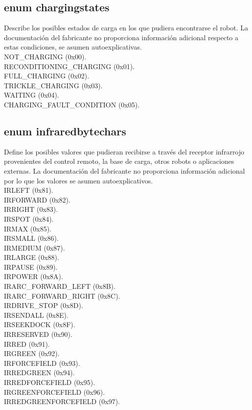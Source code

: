 \documentclass[letterpaper]{book}
\begin{document}
\subsection{enum  chargingstates}
Describe los posibles estados de carga en los que pudiera encontrarse el robot. La documentación del fabricante no proporciona información adicional respecto a estas condiciones, se asumen autoexplicativas.\\
NOT\_CHARGING (0x00).\\
RECONDITIONING\_CHARGING (0x01).\\
FULL\_CHARGING (0x02).\\
TRICKLE\_CHARGING (0x03).\\
WAITING (0x04).\\
CHARGING\_FAULT\_CONDITION (0x05).\\

\subsection{enum infraredbytechars}
Define los posibles valores que pudieran recibirse a través del receptor infrarrojo provenientes del control remoto, la base de carga, otros robots o aplicaciones externas. La documentación del fabricante no proporciona información adicional por lo que los valores se asumen autoexplicativos.\\
IRLEFT (0x81).\\
IRFORWARD (0x82).\\
IRRIGHT (0x83).\\
IRSPOT (0x84).\\
IRMAX (0x85).\\
IRSMALL (0x86).\\
IRMEDIUM (0x87).\\
IRLARGE (0x88).\\
IRPAUSE (0x89).\\
IRPOWER (0x8A).\\
IRARC\_FORWARD\_LEFT (0x8B).\\
IRARC\_FORWARD\_RIGHT (0x8C).\\
IRDRIVE\_STOP (0x8D).\\
IRSENDALL (0x8E).\\
IRSEEKDOCK (0x8F).\\
IRRESERVED (0x90).\\
IRRED (0x91).\\
IRGREEN (0x92).\\
IRFORCEFIELD (0x93).\\
IRREDGREEN (0x94).\\
IRREDFORCEFIELD (0x95).\\
IRGREENFORCEFIELD (0x96).\\
IRREDGREENFORCEFIELD (0x97).\\
\end{document}
